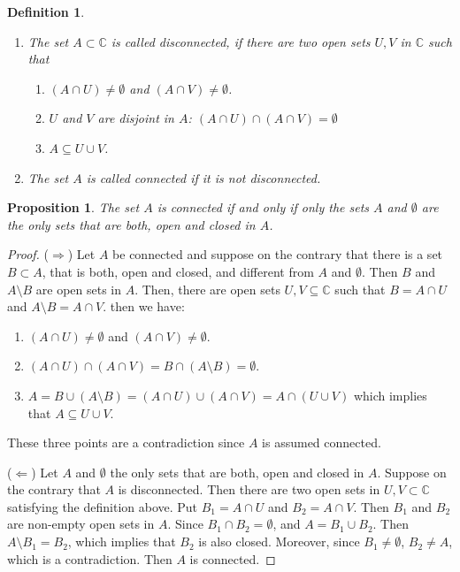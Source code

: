 \documentclass{amsart}
\newtheorem{prop}{Proposition}
\newtheorem{mydef}{Definition}
\begin{document}
\begin{mydef}
\begin{enumerate}
\item The set \(A\subset \mathbb{C}\) is called \alert{disconnected}, if there are two open sets \(U,V\) in \(\mathbb{C}\) such that
\begin{enumerate}
\item \((A\cap U) \neq \emptyset\) and \((A\cap V) \neq \emptyset\).
\item \(U\) and \(V\) are disjoint in \(A\): \((A\cap U) \cap( A\cap  V) = \emptyset\)
\item \(A\subseteq U\cup V\).
\end{enumerate}

\item The set \(A\) is called \alert{connected} if it is not disconnected.
\end{enumerate}
\end{mydef}

\begin{prop}
The set \(A\) is connected if and only if only the sets \(A\) and \(\emptyset\) are the only sets that are both, open and closed in \(A\).
\end{prop}
\begin{proof}
(\(\Rightarrow\)) Let \(A\) be connected and suppose on the contrary that there is a set \(B\subset A\), that is both, open and closed, and different from \(A\) and \(\emptyset\).
Then \(B\) and \(A\setminus B\) are open sets in \(A\). Then, there are open sets \(U,V\subseteq\mathbb{C}\) such that \(B = A\cap U\) and \(A\setminus B = A \cap V\).
then we have:
\begin{enumerate}
\item \((A\cap U) \neq \emptyset\) and \((A\cap V) \neq \emptyset\).
\item \((A\cap U) \cap( A\cap  V) = B \cap (A\setminus B) = \emptyset\).
\item \(A = B\cup (A\setminus B) = (A\cap U) \cup( A\cap  V) = A \cap \left( U \cup V \right)\) which implies that \(A \subseteq U\cup V\).
\end{enumerate}
These three points are a contradiction since \(A\) is assumed connected.

(\(\Leftarrow\)) Let \(A\) and \(\emptyset\) the only sets that are both, open and closed in \(A\). Suppose on the contrary that \(A\) is disconnected. Then there are two open sets in \(U,V\subset \mathbb{C}\) 
satisfying the definition above. Put \(B_1  = A\cap U\) and \(B_2 = A \cap V\). Then \(B_1\) and \(B_2\) are non-empty open sets in \(A\). Since \(B_1 \cap B_2 = \emptyset\), and \(A = B_1\cup B_2\).
Then \(A\setminus B_1 = B_2\), which implies that \(B_2\) is also closed. Moreover, since \(B_1\neq \emptyset\), \(B_2 \neq A\), which is a contradiction. Then \(A\) is connected.
\end{proof}
\end{document}
